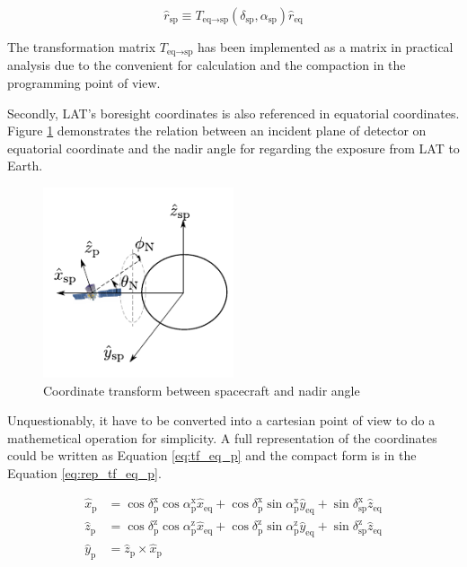 \begin{equation}
    \hat{r}_\text{sp} \equiv T_{\text{eq}\rightarrow\text{sp}} (\delta_\text{sp}, \alpha_\text{sp}) \hat{r}_\text{eq}
    \label{eq:rep_tf_eq_sp}
\end{equation}

The transformation matrix $T_{\text{eq}\rightarrow\text{sp}}$ has been implemented as a matrix in practical
analysis due to the convenient for calculation and the compaction 
in the programming point of view.

Secondly, LAT's boresight coordinates is also referenced in equatorial 
coordinates. Figure \ref{fig:coord_eq_p} demonstrates the relation between
an incident plane of detector on equatorial coordinate and the 
nadir angle for regarding the exposure from LAT to Earth.

\begin{figure}[h!]
    \centering
    \includegraphics[width=0.5\textwidth]{content/methodology/figures/coord_eq_p.pdf}
    \caption{Coordinate transform between spacecraft and nadir angle}
    \label{fig:coord_eq_p}
\end{figure}

Unquestionably, it have to be converted into a cartesian 
point of view to do a mathemetical operation for simplicity. A 
full representation of the coordinates could be written as Equation \ref{eq:tf_eq_p}
and the compact form is in the Equation \ref{eq:rep_tf_eq_p}.

\begin{equation}
    \begin{split}
    \hat{x}_\text{p} &= \cos\delta^\text{x}_\text{p}\cos\alpha^\text{x}_\text{p}\hat{x}_\text{eq} + \cos\delta^\text{x}_\text{p}\sin\alpha^\text{x}_\text{p}\hat{y}_\text{eq} + \sin\delta^\text{x}_\text{sp}\hat{z}_\text{eq}\\
    \hat{z}_\text{p} &= \cos\delta^\text{z}_\text{p}\cos\alpha^\text{z}_\text{p}\hat{x}_\text{eq} + \cos\delta^\text{z}_\text{p}\sin\alpha^\text{z}_\text{p}\hat{y}_\text{eq} + \sin\delta^\text{z}_\text{sp}\hat{z}_\text{eq}\\
    \hat{y}_\text{p} &= \hat{z}_\text{p} \times \hat{x}_\text{p}
    \end{split}
    \label{eq:tf_eq_p}
\end{equation}

